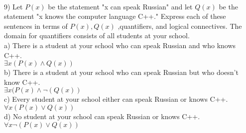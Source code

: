 \documentclass{article}
\begin{document}
\begin{flushleft}
~\\
\setlength\parindent{0pt}9) Let $P(x)$ be the statement "x can speak Russian" and let $Q(x)$ be the statement "x knows the computer language C++."  Express each of these sentences in terms of $P(x), Q(x)$ ,quantifiers, and logical connectives.  The domain for quantifiers consists of all students at your school.  \\
\setlength\parindent{24pt}a) There is a student at your school who can speak Russian and who knows C++. \\
\setlength\parindent{48pt} $\exists x (P(x) \land Q(x))$ \\
\setlength\parindent{24pt}b) There is a student at your school who can speak Russian but who doesn't know C++.\\
\setlength\parindent{48pt} $\exists x (P(x) \land \neg (Q(x))$\\
\setlength\parindent{24pt}c) Every student at your school either can speak Russian or knows C++. \\
\setlength\parindent{48pt} $\forall x (P(x) \lor Q(x))$ \\
\setlength\parindent{24pt}d) No student at your school can speak Russian or knows C++. \\
\setlength\parindent{48pt} $\forall x \neg (P(x) \lor Q(x))$\\


\end{flushleft}
\end{document}
